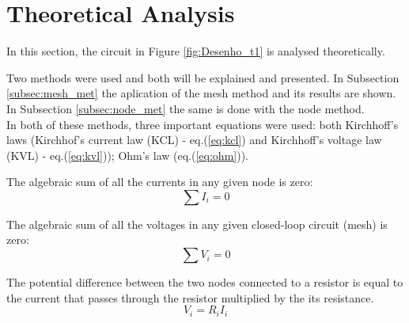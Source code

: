 
\section{Theoretical Analysis}
\label{sec:analysis}



In this section, the circuit in Figure \ref{fig:Desenho_t1} is analysed theoretically.

Two methods were used and both will be explained and presented. In Subsection \ref{subsec:mesh_met}
the aplication of the mesh method and its results are shown. In Subsection \ref{subsec:node_met} the
same is done with the node method. \\

In both of these methods, three important equations were used: both Kirchhoff's laws (Kirchhof's
current law (KCL) - eq.(\ref{eq:kcl}) and Kirchhoff's voltage law (KVL) - eq.(\ref{eq:kvl}));
Ohm's law (eq.(\ref{eq:ohm})).

The algebraic sum of all the currents in any given node is zero:
\begin{equation}
	\sum I_i = 0
	\label{eq:kcl}
\end{equation}

The algebraic sum of all the voltages in any given closed-loop circuit (mesh) is zero:
\begin{equation}
	\sum V_i = 0
	\label{eq:kvl}
\end{equation}

The potential difference between the two nodes connected to a resistor is equal to the current that 
passes through the resistor multiplied by the its resistance.
\begin{equation}
	V_i = R_iI_i
	\label{eq:ohm}
\end{equation}




